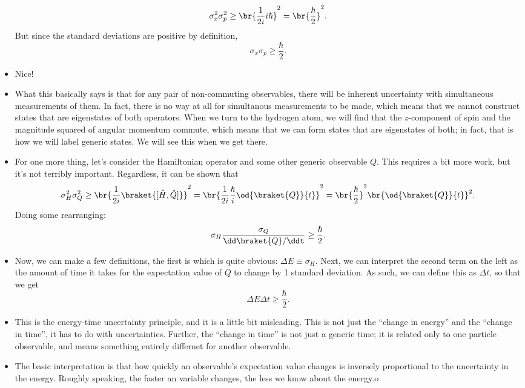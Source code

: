 \begin{itemize}
        \begin{equation*}
            \sigma_x^2\sigma_p^2 \geq \br{\frac{1}{2i} i\hbar}^2 = \br{\frac{\hbar}{2}}^2.
        \end{equation*}
        But since the standard deviations are positive by definition,
        \begin{equation}
            \boxed{\sigma_x\sigma_p \geq \frac{\hbar}{2}.}
        \end{equation}
    \item Nice!
    \item What this basically says is that for any pair of non-commuting observables, there will be inherent uncertainty with simultaneous measurements of them. In fact, there is no way at all for simultanous measurements to be made, which means that we cannot construct states that are eigenstates of both operators. When we turn to the hydrogen atom, we will find that the $z$-component of spin and the magnitude squared of angular momentum commute, which means that we can form states that are eigenstates of both; in fact, that is how we will label generic states. We will see this when we get there.
    \item For one more thing, let's consider the Hamiltonian operator and some other generic observable $Q$. This requires a bit more work, but it's not terribly important. Regardless, it can be shown that 
        \begin{equation*}
            \sigma_H^2\sigma_Q^2 \geq \br{\frac{1}{2i}\braket{[\hat{H},\hat{Q}]}}^2 = \br{\frac{1}{2i}\frac{\hbar}{i} \od{\braket{Q}}{t}}^2 = \br{\frac{\hbar}{2}}^2\br{\od{\braket{Q}}{t}}^2.
        \end{equation*}
        Doing some rearranging:
        \begin{equation*}
            \sigma_H \frac{\sigma_Q}{\dd\braket{Q}/\ddt} \geq \frac{\hbar}{2}.
        \end{equation*}
    \item Now, we can make a few definitions, the first is which is quite obvious: $\Delta E \equiv \sigma_H$. Next, we can interpret the second term on the left as the amount of time it takes for the expectation value of $Q$ to change by 1 standard deviation. As such, we can define this as $\Delta t$, so that we get
        \begin{equation}
            \boxed{\Delta E \Delta t \geq \frac{\hbar}{2}.}
        \end{equation}
    \item This is the energy-time uncertainty principle, and it is a little bit misleading. This is not just the ``change in energy'' and the ``change in time'', it has to do with uncertainties. Further, the ``change in time'' is not just a generic time; it is related only to one particle observable, and means something entirely differnet for another observable.
    \item The basic interpretation is that how quickly an observable's expectation value changes is inversely proportional to the uncertainty in the energy. Roughly speaking, the faster an variable changes, the less we know about the energy.o
\end{itemize}
